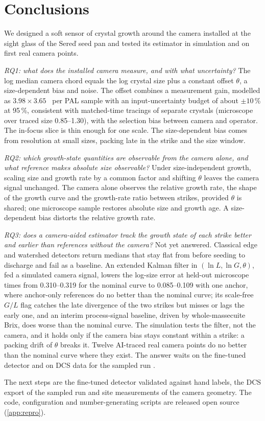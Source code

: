 \section{Conclusions}\label{sec:conclusions}

We designed a soft sensor of crystal growth around the camera installed at the sight glass of the Sere\v{d} seed pan
and tested its estimator in simulation and on first real camera points.

\emph{RQ1: what does the installed camera measure, and with what uncertainty?} The log median camera chord equals the log crystal size plus a constant offset
$\theta$, a size-dependent bias and noise. The offset combines a measurement gain, modelled as $3.98 \times 3.65$~\um{}
per PAL sample with an input-uncertainty budget of about $\pm 10$\,\% at 95\,\%, consistent with matched-time tracings of separate crystals (microscope over traced
size 0.85--1.30), with
the selection bias between camera and operator. The in-focus slice is thin enough for one scale. The size-dependent bias comes from resolution at small
sizes, packing late in the strike and the size window.

\emph{RQ2: which growth-state quantities are observable from the camera alone, and what reference makes absolute
size observable?} Under size-independent growth, scaling size and growth rate by a common factor and
shifting $\theta$ leaves the camera signal unchanged. The camera alone observes the relative growth rate, the shape of
the growth curve and the growth-rate ratio between strikes, provided $\theta$ is shared; one microscope sample
restores absolute size and growth age. A size-dependent bias distorts the relative growth rate.

\emph{RQ3: does a camera-aided estimator track the growth state of each strike better and earlier than references
without the camera?} Not yet answered. Classical edge and watershed detectors return medians that stay flat from
before seeding to discharge and fail as a baseline. An extended Kalman filter in
$(\ln L, \ln G, \theta)$, fed a simulated camera signal, lowers the log-size error at held-out microscope times from
0.310--0.319 for the nominal curve to 0.085--0.109 with one anchor, where anchor-only references do no better than the
nominal curve; its scale-free $G/L$ flag catches the late divergence of the two strikes but misses or lags the early
one, and an interim process-signal baseline, driven by whole-massecuite Brix, does worse than the nominal curve.
The simulation tests the filter, not the camera, and it holds only if the camera bias stays constant within a strike: a
packing drift of $\theta$ breaks it. Twelve AI-traced real camera points do no better than the nominal curve where
they exist. The answer waits on the fine-tuned detector and on DCS data for the sampled run
.

The next steps are the fine-tuned detector validated against hand labels, the DCS export of the sampled run and site
measurements of the camera geometry. The code, configuration and number-generating scripts are released open source
(\ref{app:repro}).
